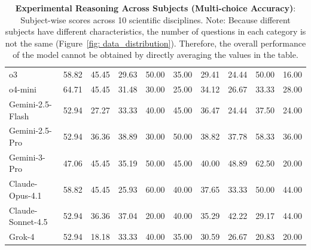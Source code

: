 \begin{table}[t]
{\begin{tabular}{lccccccccc}
o3 & 58.82 & 45.45 & 29.63 & 50.00 & 35.00 & 29.41 & 24.44 & 50.00 & 16.00 \\
o4-mini & 64.71 & 45.45 & 31.48 & 30.00 & 25.00 & 34.12 & 26.67 & 33.33 & 28.00 \\
Gemini-2.5-Flash & 52.94 & 27.27 & 33.33 & 40.00 & 45.00 & 36.47 & 24.44 & 37.50 & 24.00 \\
Gemini-2.5-Pro & 52.94 & 36.36 & 38.89 & 30.00 & 50.00 & 38.82 & 37.78 & 58.33 & 36.00 \\
Gemini-3-Pro & 47.06 & 45.45 & 35.19 & 50.00 & 45.00 & 40.00 & 48.89 & 62.50 & 20.00 \\
Claude-Opus-4.1 & 58.82 & 45.45 & 25.93 & 60.00 & 40.00 & 37.65 & 33.33 & 50.00 & 44.00 \\
Claude-Sonnet-4.5 & 52.94 & 36.36 & 37.04 & 20.00 & 40.00 & 35.29 & 42.22 & 29.17 & 44.00 \\
Grok-4 & 52.94 & 18.18 & 33.33 & 40.00 & 35.00 & 30.59 & 26.67 & 20.83 & 20.00 \\
\bottomrule
\end{tabular}
}
\caption{\textbf{Experimental Reasoning Across Subjects (Multi-choice Accuracy)}: Subject-wise scores across 10 scientific disciplines. Note: Because different subjects have different characteristics, the number of questions in each category is not the same (Figure~\ref{fig: data_distribution}). Therefore, the overall performance of the model cannot be obtained by directly averaging the values in the table.}
\label{tab:mcp_subject_metric_table}
\end{table}
